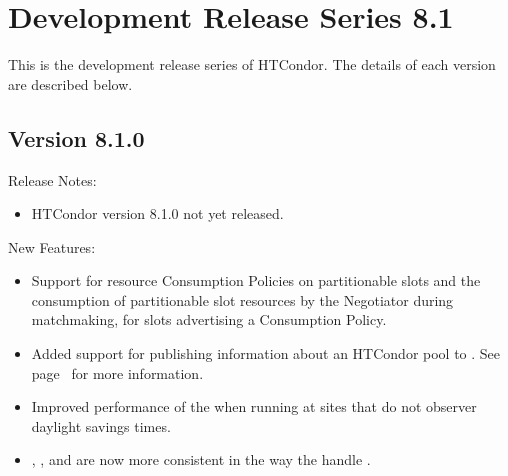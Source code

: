 
\section{\label{sec:History-8-1}Development Release Series 8.1}

This is the development release series of HTCondor.
The details of each version are described below.

\subsection*{\label{sec:New-8-1-0}Version 8.1.0}

\noindent Release Notes:

\begin{itemize}

\item HTCondor version 8.1.0 not yet released.

\end{itemize}


\noindent New Features:

\begin{itemize}

\item Support for resource Consumption Policies on partitionable slots and 
the consumption of partitionable slot resources by the Negotiator 
during matchmaking, for slots advertising a Consumption Policy.

\item Added support for publishing information about an HTCondor pool to .
See page~\pageref{sec:Config-gangliad} for more information.

\item Improved performance of the  when running
at sites that do not observer daylight savings times.

\item {}, ,  and  are now more consistent
in the way the handle .

\end{itemize}

